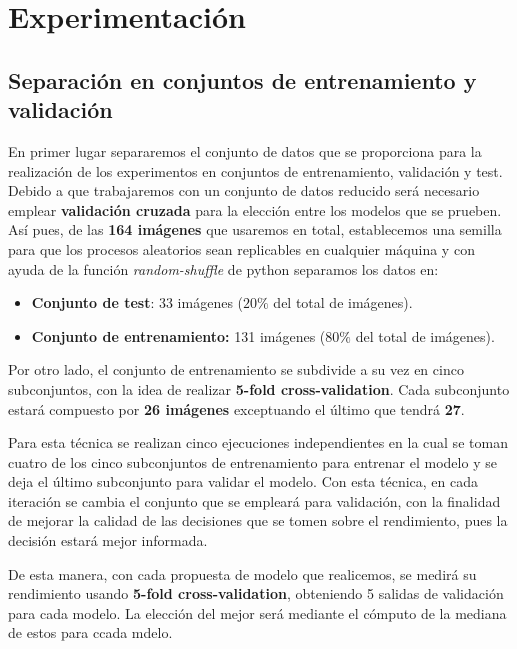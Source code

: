 \chapter{Experimentación}

\section{Separación en conjuntos de entrenamiento y validación}
    \noindent En primer lugar separaremos el conjunto de datos que se proporciona para la realización de los experimentos en conjuntos de entrenamiento, validación y test. Debido a que trabajaremos con un conjunto de datos reducido será necesario emplear \textbf{validación cruzada} para la elección entre los modelos que se prueben. Así pues, de las \textbf{164 imágenes} que usaremos en total, establecemos una semilla para que los procesos aleatorios sean replicables en cualquier máquina y con ayuda de la función \textit{random-shuffle} de python separamos los datos en: 
    \begin{itemize}
        \item \textbf{Conjunto de test}: 33 imágenes ($20\%$ del total de imágenes).
        \item \textbf{Conjunto de entrenamiento:} 131 imágenes ($80\%$ del total de imágenes).
    \end{itemize}

    \noindent Por otro lado, el conjunto de entrenamiento se subdivide a su vez en cinco subconjuntos, con la idea de realizar \textbf{5-fold cross-validation}. Cada subconjunto estará compuesto por \textbf{26 imágenes} exceptuando el último que tendrá \textbf{27}.
    
    \medskip

    \noindent Para esta técnica se realizan cinco ejecuciones independientes en la cual se toman cuatro de los cinco subconjuntos de entrenamiento para entrenar el modelo y se deja el último subconjunto para validar el modelo. Con esta técnica, en cada iteración se cambia el conjunto que se empleará para validación, con la finalidad de mejorar la calidad de las decisiones que se tomen sobre el rendimiento, pues la decisión estará mejor informada. 

    \medskip

    \noindent De esta manera, con cada propuesta de modelo que realicemos, se medirá su rendimiento usando \textbf{5-fold cross-validation}, obteniendo 5 salidas de validación para cada modelo. La elección del mejor será mediante el cómputo de la mediana de estos para ccada mdelo.

